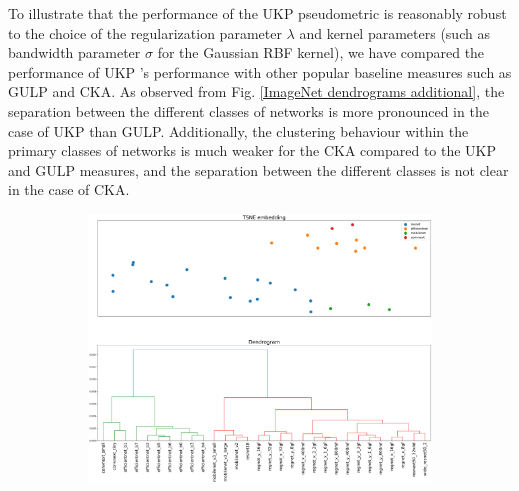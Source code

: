 \documentclass[11pt]{article}
\newcommand{\metricstname}{UKP }
\theoremstyle{plain}
\begin{document}
To illustrate that the performance of the \metricstname pseudometric is reasonably robust to the choice of the regularization parameter $\lambda$ and kernel parameters (such as bandwidth parameter $\sigma$ for the Gaussian RBF kernel), we have compared the performance of \metricstname's performance with other popular baseline measures such as GULP and CKA. As observed from Fig. \ref{ImageNet dendrograms additional}, the separation between the different classes of networks is more pronounced in the case of \metricstname than GULP. Additionally, the clustering behaviour within the primary classes of networks is much weaker for the CKA compared to the \metricstname and GULP measures, and the separation between the different classes is not clear in the case of CKA.

\begin{figure}[!h]
    \centering

    \hspace*{\fill}
    \begin{subfigure}[b]{0.45\textwidth}
        \includegraphics[width=\textwidth]{Appendix figures/imagenet_experiments/Additional comparisons for UKP with GULP and CKA/DendogramandTSNE for UKP_dist_RBF_1.000000e+00_1.000000e+01_mainpaper.png}
    \end{subfigure}
    \hspace*{\fill}

    \vspace{0.5cm}  %
    

\end{figure}
\end{document}
